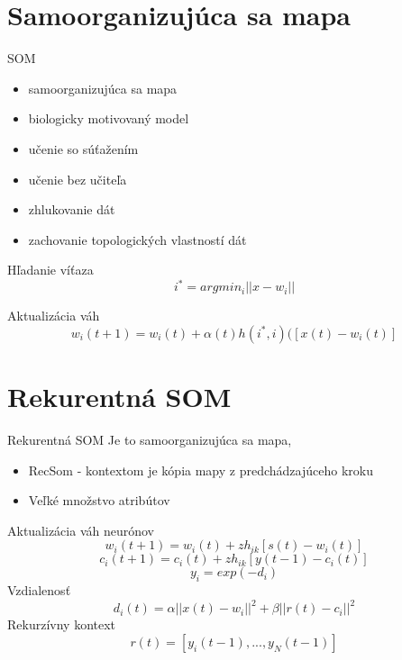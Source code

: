 \documentclass[10pt]{beamer}
\begin{document}
\section{Samoorganizujúca sa mapa}
\begin{frame}[fragile]{SOM}

\begin{itemize}
  \item samoorganizujúca sa mapa
  \item biologicky motivovaný model
  \item učenie so súťažením
  \item učenie bez učiteľa
  \item zhlukovanie dát
  \item zachovanie topologických vlastností dát
\end{itemize}

Hľadanie víťaza
\begin{equation*}
i^* = argmin_i||x-w_i|| 
\end{equation*}

Aktualizácia váh
\begin{equation*}
w_i(t+1) = w_i(t) + \alpha(t)h(i^*, i)([x(t) - w_i(t)]
\end{equation*}

\end{frame}

\section{Rekurentná SOM}

\begin{frame}[fragile]{Rekurentná SOM}
Je to samoorganizujúca sa mapa, 
\begin{itemize}
\item RecSom - kontextom je kópia mapy z predchádzajúceho kroku
\item Veľké množstvo atribútov
\end{itemize}
Aktualizácia váh neurónov
\begin{equation*}
w_i(t+1) = w_i(t) + zh_{ik}[s(t) - w_i(t)]
\end{equation*}
\begin{equation*}
c_i(t+1) = c_i(t) + zh_{ik}[y(t - 1) - c_i(t)]
\end{equation*}
\begin{equation*}
y_i=exp(-d_i)
\end{equation*}
Vzdialenosť
\begin{equation*}
d_i(t) = \alpha||x(t)-w_i||^2 + \beta||r(t)-c_i||^2
\end{equation*}
Rekurzívny kontext
\begin{equation*}
r(t)=[y_i(t-1),...,y_N(t-1)]
\end{equation*}
\end{frame}
\end{document}

